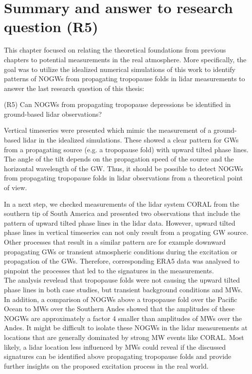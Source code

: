 \section{Summary and answer to research question (R5)}
\label{sec:lidOb-summary}
This chapter focused on relating the theoretical foundations from previous chapters to potential measurements in the real atmosphere. More specifically, the goal was to utilize the idealized numerical simulations of this work to identify patterns of NOGWs from propagating tropopause folds in lidar measurements to answer the last research question of this thesis:
%
\begin{tcolorbox}[]
    (R5) Can NOGWs from propagating tropopause depressions be identified in ground-based lidar observations?
\end{tcolorbox}
%
Vertical timeseries were presented which mimic the measurement of a ground-based lidar in the idealized simulations. These showed a clear pattern for GWs from a propagating source (e.g. a tropopause fold) with upward tilted phase lines. The angle of the tilt depends on the propagation speed of the source and the horizontal wavelength of the GW. Thus, it should be possible to detect NOGWs from propagating tropopause folds in lidar observations from a theoretical point of view.

In a next step, we checked measurements of the lidar system CORAL from the southern tip of South America and presented two observations that include the pattern of upward tilted phase lines in the lidar data. However, upward tilted phase lines in vertical timeseries can not only result from a progating GW source. Other processes that result in a similar pattern are for example downward propagating GWs or transient atmospheric conditions during the excitation or propagation of the GWs. Therefore, corresponding ERA5 data was analysed to pinpoint the processes that led to the signatures in the measurements. \\
The analysis revelead that tropopause folds were not causing the upward tilted phase lines in both case studies, but transient background conditions and MWs. In addition, a comparison of NOGWs above a tropopause fold over the Pacific Ocean to MWs over the Southern Andes showed that the amplitudes of these NOGWs are approximately a factor 4 smaller than amplitudes of MWs over the Andes. It might be difficult to isolate these NOGWs in the lidar measurements at locations that are generally dominated by strong MW events like CORAL. Most likely, a lidar location less influenced by MWs could reveal if the discussed signatures can be identified above propagating tropopause folds and provide further insights on the proposed excitation process in the real world.

